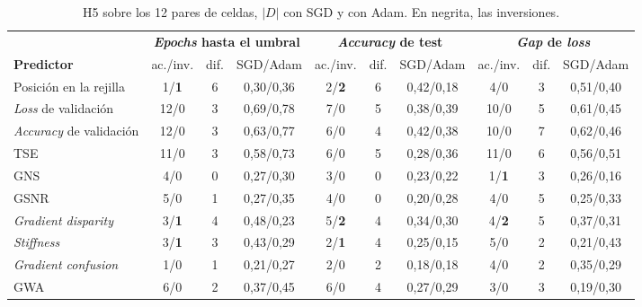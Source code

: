 \begin{table}[ht]
\centering
\footnotesize
\setlength{\tabcolsep}{2.5pt}
\caption{H5 sobre los 12 pares de celdas, $|D|$ con SGD y con Adam. En negrita, las inversiones.}
\label{tab:h5}
\begin{tabular}{lccccccccc}
\toprule
& \multicolumn{3}{c}{\textbf{\emph{Epochs} hasta el umbral}} & \multicolumn{3}{c}{\textbf{\emph{Accuracy} de test}} & \multicolumn{3}{c}{\textbf{\emph{Gap} de \emph{loss}}} \\
\cmidrule(lr){2-4}\cmidrule(lr){5-7}\cmidrule(lr){8-10}
\textbf{Predictor} & ac./inv. & dif. & SGD/Adam & ac./inv. & dif. & SGD/Adam & ac./inv. & dif. & SGD/Adam \\
\midrule
Posición en la rejilla & 1/\textbf{1} & 6 & 0,30/0,36 & 2/\textbf{2} & 6 & 0,42/0,18 & 4/0 & 3 & 0,51/0,40 \\
\addlinespace
\emph{Loss} de validación & 12/0 & 3 & 0,69/0,78 & 7/0 & 5 & 0,38/0,39 & 10/0 & 5 & 0,61/0,45 \\
\emph{Accuracy} de validación & 12/0 & 3 & 0,63/0,77 & 6/0 & 4 & 0,42/0,38 & 10/0 & 7 & 0,62/0,46 \\
TSE & 11/0 & 3 & 0,58/0,73 & 6/0 & 5 & 0,28/0,36 & 11/0 & 6 & 0,56/0,51 \\
\addlinespace
GNS & 4/0 & 0 & 0,27/0,30 & 3/0 & 0 & 0,23/0,22 & 1/\textbf{1} & 3 & 0,26/0,16 \\
GSNR & 5/0 & 1 & 0,27/0,35 & 4/0 & 0 & 0,20/0,28 & 4/0 & 5 & 0,25/0,33 \\
\emph{Gradient disparity} & 3/\textbf{1} & 4 & 0,48/0,23 & 5/\textbf{2} & 4 & 0,34/0,30 & 4/\textbf{2} & 5 & 0,37/0,31 \\
\addlinespace
\emph{Stiffness} & 3/\textbf{1} & 3 & 0,43/0,29 & 2/\textbf{1} & 4 & 0,25/0,15 & 5/0 & 2 & 0,21/0,43 \\
\emph{Gradient confusion} & 1/0 & 1 & 0,21/0,27 & 2/0 & 2 & 0,18/0,18 & 4/0 & 2 & 0,35/0,29 \\
GWA & 6/0 & 2 & 0,37/0,45 & 6/0 & 4 & 0,27/0,29 & 3/0 & 3 & 0,19/0,30 \\
\bottomrule
\end{tabular}
\end{table}

